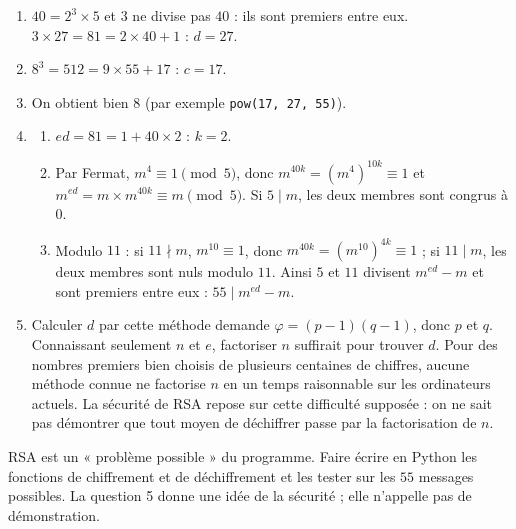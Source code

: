 \begin{solution}[Problème]
\begin{enumerate}
\item $40=2^3\times5$ et $3$ ne divise pas $40$ : ils sont premiers entre eux. $3\times27=81=2\times40+1$ : $d=27$.
\item $8^3=512=9\times55+17$ : $c=17$.
\item On obtient bien $8$ (par exemple \texttt{pow(17, 27, 55)}).
\item
\begin{enumerate}
\item $ed=81=1+40\times2$ : $k=2$.
\item Par Fermat, $m^4\equiv1\pmod5$, donc $m^{40k}=\left(m^4\right)^{10k}\equiv1$ et $m^{ed}=m\times m^{40k}\equiv m\pmod5$. Si $5\mid m$, les deux membres sont congrus à $0$.
\item Modulo $11$ : si $11\nmid m$, $m^{10}\equiv1$, donc $m^{40k}=\left(m^{10}\right)^{4k}\equiv1$ ; si $11\mid m$, les deux membres sont nuls modulo $11$. Ainsi $5$ et $11$ divisent $m^{ed}-m$ et sont premiers entre eux : $55\mid m^{ed}-m$.
\end{enumerate}
\item Calculer $d$ par cette méthode demande $\varphi=(p-1)(q-1)$, donc $p$ et $q$. Connaissant seulement $n$ et $e$, factoriser $n$ suffirait pour trouver $d$. Pour des nombres premiers bien choisis de plusieurs centaines de chiffres, aucune méthode connue ne factorise $n$ en un temps raisonnable sur les ordinateurs actuels. La sécurité de RSA repose sur cette difficulté supposée : on ne sait pas démontrer que tout moyen de déchiffrer passe par la factorisation de $n$.
\end{enumerate}
\end{solution}
\begin{teachernote}
RSA est un « problème possible » du programme. Faire écrire en Python les fonctions de chiffrement et de déchiffrement et les tester sur les $55$ messages possibles. La question 5 donne une idée de la sécurité ; elle n'appelle pas de démonstration.
\end{teachernote}
